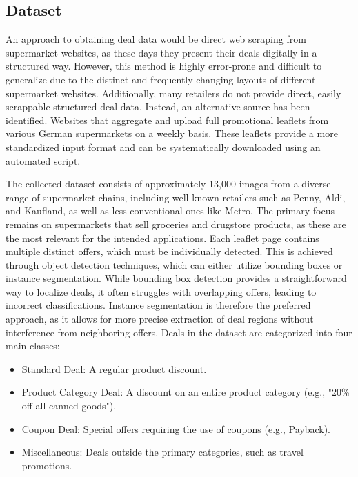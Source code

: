 \documentclass[11pt]{article}
\begin{document}
\subsection{Dataset}
An approach to obtaining deal data would be direct web scraping from supermarket websites, as these days they present their deals digitally in a structured way. However, this method is highly error-prone and difficult to generalize due to the distinct and frequently changing layouts of different supermarket websites. Additionally, many retailers do not provide direct, easily scrappable structured deal data. Instead, an alternative source has been identified. Websites that aggregate and upload full promotional leaflets from various German supermarkets on a weekly basis. These leaflets provide a more standardized input format and can be systematically downloaded using an automated script.

The collected dataset consists of approximately 13,000 images from a diverse range of supermarket chains, including well-known retailers such as Penny, Aldi, and Kaufland, as well as less conventional ones like Metro. The primary focus remains on supermarkets that sell groceries and drugstore products, as these are the most relevant for the intended applications. Each leaflet page contains multiple distinct offers, which must be individually detected. This is achieved through object detection techniques, which can either utilize bounding boxes or instance segmentation. While bounding box detection provides a straightforward way to localize deals, it often struggles with overlapping offers, leading to incorrect classifications. Instance segmentation is therefore the preferred approach, as it allows for more precise extraction of deal regions without interference from neighboring offers. Deals in the dataset are categorized into four main classes:

\begin{itemize}
    \item Standard Deal: A regular product discount.
    \item Product Category Deal: A discount on an entire product category (e.g., "20\% off all canned goods").
    \item Coupon Deal: Special offers requiring the use of coupons (e.g., Payback).
    \item Miscellaneous: Deals outside the primary categories, such as travel promotions.
\end{itemize}
\end{document}
